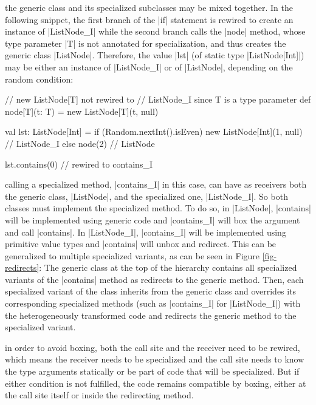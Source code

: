  the generic class and its specialized subclasses may be mixed together. In the following snippet, the first branch of the |if| statement is rewired to create an instance of |ListNode_I| while the second branch calls the |node| method, whose type parameter |T| is not annotated for specialization, and thus creates the generic class |ListNode|. Therefore, the value |lst| (of static type |ListNode[Int]|) may be either an instance of |ListNode_I| or of |ListNode|, depending on the random condition:

\begin{lstlisting-nobreak}
 // new ListNode[T] not rewired to
 // ListNode_I since T is a type parameter
 def node[T](t: T) = new ListNode[T](t, null)

 val lst: ListNode[Int] =
   if (Random.nextInt().isEven)
     new ListNode[Int](1, null) // ListNode_I
   else
     node(2)                             // ListNode

 lst.contains(0) // rewired to contains_I
\end{lstlisting-nobreak}

 calling a specialized method, |contains_I| in this case, can have as receivers both the generic class, |ListNode|, and the specialized one, |ListNode_I|. So both classes must implement the specialized method. To do so, in |ListNode|, |contains| will be implemented using generic code and |contains_I| will box the argument and call |contains|. In |ListNode_I|, |contains_I| will be implemented using primitive value types and |contains| will unbox and redirect. This can be generalized to multiple specialized variants, as can be seen in Figure \ref{fig-redirects}: The generic class at the top of the hierarchy contains all specialized variants of the |contains| method as redirects to the generic method. Then, each specialized variant of the class inherits from the generic class and overrides its corresponding specialized methods (such as |contains_I| for |ListNode_I|) with the heterogeneously transformed code and redirects the generic method to the specialized variant.

 in order to avoid boxing, both the call site and the receiver need to be rewired, which means the receiver needs to be specialized and the call site needs to know the type arguments statically or be part of code that will be specialized. But if either condition is not fulfilled, the code remains compatible by boxing, either at the call site itself or inside the redirecting method.

